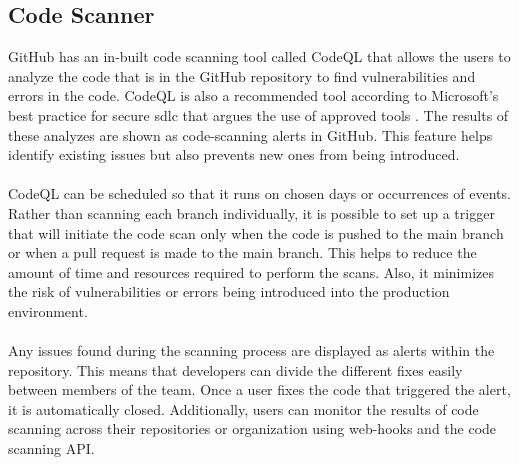 \subsection{Code Scanner}
GitHub has an in-built code scanning tool called CodeQL that allows the users to analyze the code that is in the GitHub repository to find vulnerabilities and errors in the code. CodeQL is also a recommended tool according to Microsoft's best practice for secure \acrshort{sdlc} that argues the use of approved tools \cite{microsoftSDLCpractices}. The results of these analyzes are shown as code-scanning alerts in GitHub. This feature helps identify existing issues but also prevents new ones from being introduced. \cite{CodeQL1}
\\~\\
CodeQL can be scheduled so that it runs on chosen days or occurrences of events. Rather than scanning each branch individually, it is possible to set up a trigger that will initiate the code scan only when the code is pushed to the main branch or when a pull request is made to the main branch. This helps to reduce the amount of time and resources required to perform the scans. Also, it minimizes the risk of vulnerabilities or errors being introduced into the production environment.
\\~\\
Any issues found during the scanning process are displayed as alerts within the repository. This means that developers can divide the different fixes easily between members of the team.  Once a user fixes the code that triggered the alert, it is automatically closed. Additionally, users can monitor the results of code scanning across their repositories or organization using web-hooks and the code scanning API. 
\cite{GithubCodeScanning}

